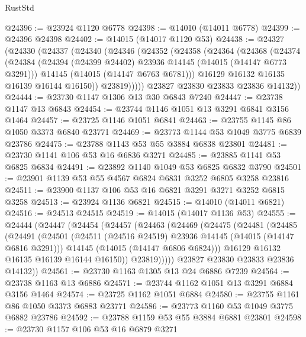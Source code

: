 \begin{lexlean}{RustStd}
\begin{coremodule}
@24396 := @23924 @1120 @6778
@24398 := @14010 (@14011 @6778)
@24399 := @24396 @24398
@24402 := @14015 (@14017 @1120 @53)
@24438 := @24327
    (@24330
      (@24337
        (@24340
          (@24346
            (@24352
              (@24358
                (@24364
                  (@24368
                    (@24374
                      (@24384
                        (@24394 (@24399 @24402) @23936 @14145 (@14015 (@14147 @6773 @3291)))
                        @14145
                        (@14015 (@14147 @6763 @6781)))
                      @16129
                      @16132
                      @16135
                      @16139
                      @16144
                      @16150))
                  @23819)))))
        @23827
        @23830
        @23833
        @23836
        @14132))
@24444 := @23730 @1147 @1306 @13 @30 @6843 @7240
@24447 := @23738 @1147 @13 @6843
@24454 := @23744 @1146 @1051 @13 @3291 @6841 @3156 @1464
@24457 := @23725 @1146 @1051 @6841
@24463 := @23755 @1145 @86 @1050 @3373 @6840 @23771
@24469 := @23773 @1144 @53 @1049 @3775 @6839 @23786
@24475 := @23788 @1143 @53 @55 @3884 @6838 @23801
@24481 := @23730 @1141 @106 @53 @16 @6836 @3271
@24485 := @23885 @1141 @53 @6825 @6834
@24491 := @23892 @1140 @1049 @53 @6825 @6832 @3790
@24501 := @23901 @1139 @53 @55 @4567 @6824 @6831 @3252 @6805 @3258 @23816
@24511 := @23900 @1137 @106 @53 @16 @6821 @3291 @3271 @3252 @6815 @3258
@24513 := @23924 @1136 @6821
@24515 := @14010 (@14011 @6821)
@24516 := @24513 @24515
@24519 := @14015 (@14017 @1136 @53)
@24555 := @24444
    (@24447
      (@24454
        (@24457
          (@24463
            (@24469
              (@24475
                (@24481
                  (@24485
                    (@24491
                      (@24501
                        (@24511 (@24516 @24519) @23936 @14145 (@14015 (@14147 @6816 @3291)))
                        @14145
                        (@14015 (@14147 @6806 @6824)))
                      @16129
                      @16132
                      @16135
                      @16139
                      @16144
                      @16150))
                  @23819)))))
        @23827
        @23830
        @23833
        @23836
        @14132))
@24561 := @23730 @1163 @1305 @13 @24 @6886 @7239
@24564 := @23738 @1163 @13 @6886
@24571 := @23744 @1162 @1051 @13 @3291 @6884 @3156 @1464
@24574 := @23725 @1162 @1051 @6884
@24580 := @23755 @1161 @86 @1050 @3373 @6883 @23771
@24586 := @23773 @1160 @53 @1049 @3775 @6882 @23786
@24592 := @23788 @1159 @53 @55 @3884 @6881 @23801
@24598 := @23730 @1157 @106 @53 @16 @6879 @3271

\end{coremodule}
\end{lexlean}
